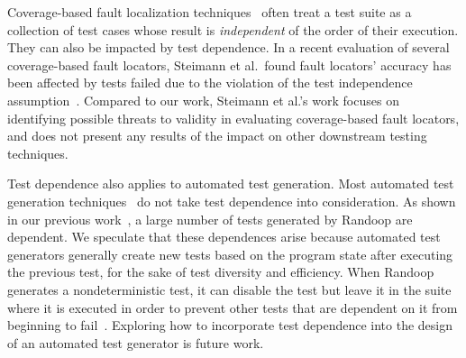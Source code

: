 

Coverage-based fault localization techniques~\cite{Jones:2002:VTI}
often treat a test suite as a collection of test cases
whose result is \textit{independent} of the order of their
execution. They can also be impacted by test dependence.
In a recent evaluation of several coverage-based fault locators,
 Steimann et al.\ found fault locators' accuracy has been 
 affected by tests failed due to the violation of the test
 independence assumption~\cite{Steimann:2013}. 
 Compared to our work, Steimann et al.'s
 work focuses on identifying possible threats to validity
 in evaluating coverage-based fault locators, and does
 not present any results of the impact on other downstream
 testing techniques.


Test dependence also applies to automated test generation.
Most automated test generation
techniques~\cite{PachecoLET2007, Wang:2007:AGC,
ZhangSBE2011} do not take test dependence
into consideration. As shown in our
previous work~\cite{testdependence, RobinsonEPAL2011},
a large number of tests generated by Randoop are dependent.
We speculate that these dependences arise because automated
test generators generally create new tests
based on the program state after executing the previous test,
for the sake of test diversity and efficiency. 
When Randoop generates a nondeterministic test, it can disable the test but
leave it in the suite where it is executed in order to prevent other tests
that are dependent on it from beginning to fail~\cite{RobinsonEPAL2011}.
Exploring how to incorporate test dependence into the design of an automated
test generator is future work.



